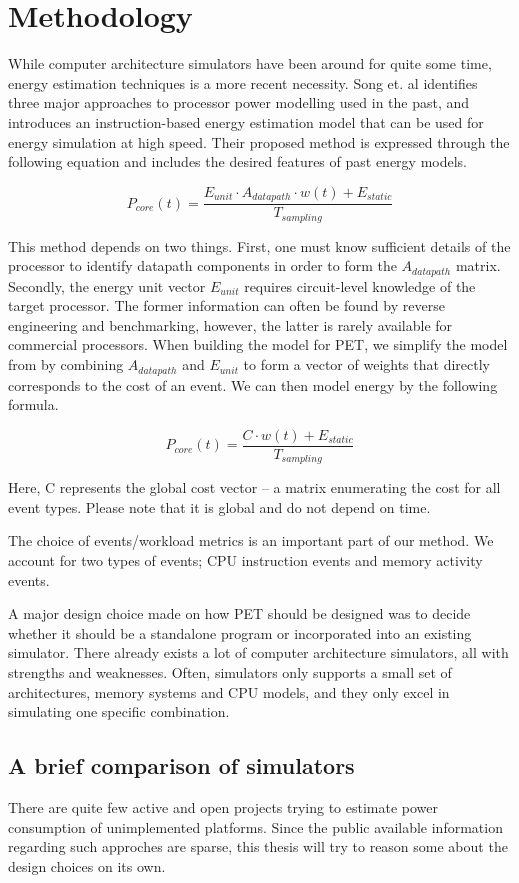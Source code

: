 \section{Methodology}

While computer architecture simulators have been around for quite some time,
energy estimation techniques is a more recent necessity. Song et. al
\cite{song2012instruction} identifies three major approaches to processor power
modelling used in the past, and introduces an instruction-based energy
estimation model that can be used for energy simulation at high speed. Their
proposed method is expressed through the following equation and includes the
desired features of past energy models.

\[
    P_{core}(t) = \frac{E_{unit} \cdot A_{datapath} \cdot w(t) +
    E_{static}}{T_{sampling}}
\]

This method depends on two things. First, one must know sufficient details of
the processor to identify datapath components in order to form the
$A_{datapath}$ matrix. Secondly, the energy unit vector $E_{unit}$ requires
circuit-level knowledge of the target processor. The former information can
often be found by reverse engineering and benchmarking, however, the latter is
rarely available for commercial processors. When building the model for PET, we
simplify the model from \cite{song2012instruction} by combining $A_{datapath}$
and $E_{unit}$ to form a vector of weights that directly corresponds to the cost
of an event. We can then model energy by the following formula.

\[
    P_{core}(t) = \frac{C \cdot w(t) + E_{static}}{T_{sampling}}
\]

Here, C represents the global cost vector -- a matrix enumerating the cost
for all event types. Please note that it is global and do not depend on time.

The choice of events/workload metrics is an important part of our method. We
account for two types of events; CPU instruction events and memory activity
events.

A major design choice made on how PET should be designed was to decide whether
it should be a standalone program or incorporated into an existing simulator.
There already exists a lot of computer architecture simulators, all with
strengths and weaknesses. Often, simulators only supports a small set of
architectures, memory systems and CPU models, and they only excel in simulating
one specific combination.

\subsection{A brief comparison of simulators}
\label{subsec:simulators}
There are quite few active and open projects trying to estimate power
consumption of unimplemented platforms. Since the public available information
regarding such approches are sparse, this thesis will try to reason some about
the design choices on its own.


